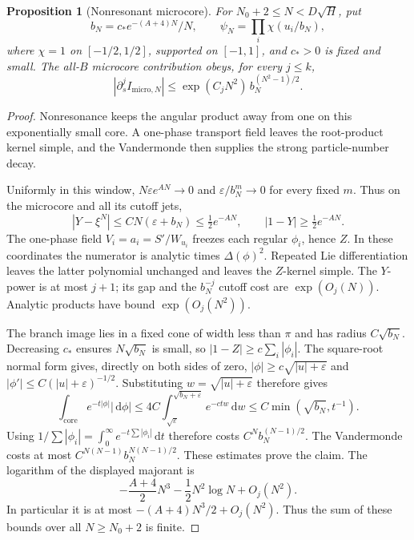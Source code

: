 \documentclass[11pt]{article}
\numberwithin{equation}{section}
\newtheorem{proposition}[theorem]{Proposition}
\theoremstyle{definition}
\newcommand{\dd}{\,\mathrm d}
\newcommand{\eps}{\varepsilon}
\begin{document}
\begin{proposition}[Nonresonant microcore]\label{prop:micro}
For \(N_0+2\le N<D\sqrt H\), put
\[
 b_N=c_*e^{-(A+4)N}/N,\qquad
 \psi_N=\prod_i\chi(u_i/b_N),
\]
where \(\chi=1\) on \([-1/2,1/2]\), supported on \([-1,1]\), and
\(c_*>0\) is fixed and small. The all-\(B\) microcore contribution
obeys, for every \(j\le k\),
\[
 |\partial_s^j I_{\mathrm{micro},N}|
 \le \exp(C_jN^2)\,b_N^{(N^2-1)/2}.
\]
\end{proposition}
\begin{proof}
Nonresonance keeps the angular product away from one on this exponentially small core. A one-phase transport field leaves the root-product kernel simple, and the Vandermonde then supplies the strong particle-number decay.

Uniformly in this window,
\(N\eps e^{AN}\to0\) and \(\eps/b_N^m\to0\) for every fixed \(m\).
Thus on the microcore and all its cutoff jets,
\[
 |Y-\xi^N|\le CN(\eps+b_N)\le\tfrac12e^{-AN},
 \qquad |1-Y|\ge\tfrac12e^{-AN}.
\]
The one-phase field \(V_i=a_i=S'/W_{u_i}\) freezes each regular
\(\phi_i\), hence \(Z\). In these coordinates the numerator is
analytic times \(\Delta(\phi)^2\).
Repeated Lie differentiation leaves the latter polynomial unchanged
and leaves the \(Z\)-kernel simple. The \(Y\)-power is at most
\(j+1\); its gap and the \(b_N^{-j}\) cutoff cost are
\(\exp(O_j(N))\). Analytic products have bound \(\exp(O_j(N^2))\).

The branch image lies in a fixed cone of width less than \(\pi\)
and has radius \(C\sqrt{b_N}\). Decreasing \(c_*\) ensures
\(N\sqrt{b_N}\) is small, so
\(|1-Z|\ge c\sum_i|\phi_i|\).
The square-root normal form gives, directly on both sides of zero,
\(|\phi|\ge c\sqrt{|u|+\eps}\) and
\(|\phi'|\le C(|u|+\eps)^{-1/2}\). Substituting
\(w=\sqrt{|u|+\eps}\) therefore gives
\[
 \int_{\mathrm{core}}e^{-t|\phi|}|\dd\phi|
       \le4C\int_{\sqrt\eps}^{\sqrt{b_N+\eps}}e^{-ctw}\dd w
       \le C\min(\sqrt{b_N},t^{-1}).
\]
Using \(1/\sum|\phi_i|=\int_0^\infty e^{-t\sum|\phi_i|}\dd t\)
therefore costs \(C^N b_N^{(N-1)/2}\).
The Vandermonde costs at most
\(C^{N(N-1)}b_N^{N(N-1)/2}\). These estimates prove the claim.
The logarithm of the displayed majorant is
\[
 -\frac{A+4}{2}N^3-\frac12N^2\log N+O_j(N^2).
\]
In particular it is at most \(-(A+4)N^3/2+O_j(N^2)\).
Thus the sum of these bounds over all \(N\ge N_0+2\) is finite.
\end{proof}
\end{document}
